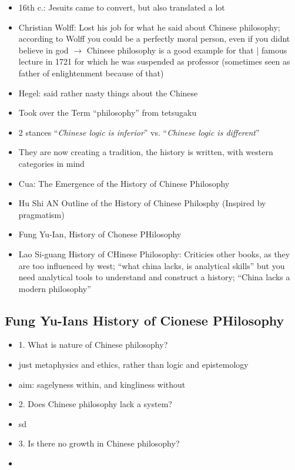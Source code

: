 \documentclass[emulatestandardclasses]{scrartcl}
\begin{document}
\begin{itemize}
  \item 16th c.: Jesuits came to convert, but also translated a lot
  \item Christian Wolff: Lost his job for what he said about Chinese philosophy; according to Wolff you could be a perfectly moral person, even if you didnt believe in god $\rightarrow$ Chinese philosophy is a good example for that | famous lecture in 1721 for which he was suspended as professor (sometimes seen as father of enlightenment because of that)
  \item Hegel: said rather nasty things about the Chinese
  \item Took over the Term "`philosophy"' from tetsugaku
  \item 2 stances "`\emph{Chinese logic is inferior}"' vs. "`\emph{Chinese logic is different}"'
  \item They are now creating a tradition, the history is written, with western categories in mind
  \item Cua: The Emergence of the History of Chinese Philosophy
  \item Hu Shi AN Outline of the History of Chinese Philosphy (Inspired by pragmatism)
  \item Fung Yu-Ian, History of Chonese PHilosophy
  \item Lao Si-guang History of CHinese Philosophy: Criticies other books, as they are too influenced by west;  "`what china lacks, is analytical skills"' but you need analytical tools to understand and construct a history; "`China lacks a modern philosophy"'
\end{itemize}


\subsection{Fung Yu-Ians History of Cionese PHilosophy}

\begin{itemize}
  \item 1. What is nature of Chinese philosophy?
  \item just metaphysics and ethics, rather than logic and epistemology
  \item aim: sagelyness within, and kingliness without
  \item 2. Does Chinese philosophy lack a system?
  \item sd
  \item 3. Is there no growth in Chinese philosophy?
  \item 
\end{itemize}
\end{document}
